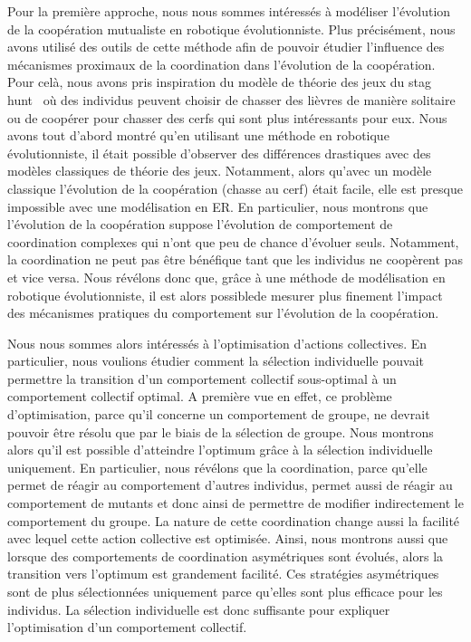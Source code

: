 		Pour la première approche, nous nous sommes intéressés à modéliser l'évolution de la coopération mutualiste en robotique évolutionniste. Plus précisément, nous avons utilisé des outils de cette méthode afin de pouvoir étudier l'influence des mécanismes proximaux de la coordination dans l'évolution de la coopération. Pour celà, nous avons pris inspiration du modèle de théorie des jeux du stag hunt~\parencite{Skyrms2004} où des individus peuvent choisir de chasser des lièvres de manière solitaire ou de coopérer pour chasser des cerfs qui sont plus intéressants pour eux. Nous avons tout d'abord montré qu'en utilisant une méthode en robotique évolutionniste, il était possible d'observer des différences drastiques avec des modèles classiques de théorie des jeux. Notamment, alors qu'avec un modèle classique l'évolution de la coopération (chasse au cerf) était facile, elle est presque impossible avec une modélisation en ER. En particulier, nous montrons que l'évolution de la coopération suppose l'évolution de comportement de coordination complexes qui n'ont que peu de chance d'évoluer seuls. Notamment, la coordination ne peut pas être bénéfique tant que les individus ne coopèrent pas et vice versa. Nous révélons donc que, grâce à une méthode de modélisation en robotique évolutionniste, il est alors possiblede mesurer plus finement l'impact des mécanismes pratiques du comportement sur l'évolution de la coopération.

		Nous nous sommes alors intéressés à l'optimisation d'actions collectives. En particulier, nous voulions étudier comment la sélection individuelle pouvait permettre la transition d'un comportement collectif sous-optimal à un comportement collectif optimal. A première vue en effet, ce problème d'optimisation, parce qu'il concerne un comportement de groupe, ne devrait pouvoir être résolu que par le biais de la sélection de groupe. Nous montrons alors qu'il est possible d'atteindre l'optimum grâce à la sélection individuelle uniquement. En particulier, nous révélons que la coordination, parce qu'elle permet de réagir au comportement d'autres individus, permet aussi de réagir au comportement de mutants et donc ainsi de permettre de modifier indirectement le comportement du groupe. La nature de cette coordination change aussi la facilité avec lequel cette action collective est optimisée. Ainsi, nous montrons aussi que lorsque des comportements de coordination asymétriques sont évolués, alors la transition vers l'optimum est grandement facilité. Ces stratégies asymétriques sont de plus sélectionnées uniquement parce qu'elles sont plus efficace pour les individus. La sélection individuelle est donc suffisante pour expliquer l'optimisation d'un comportement collectif.

